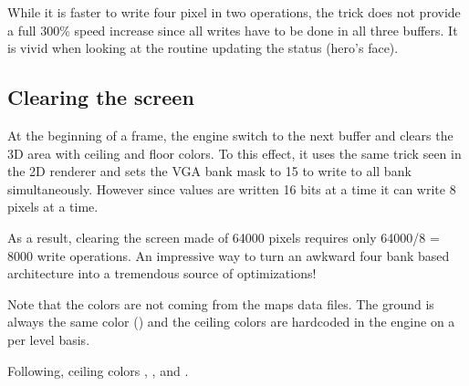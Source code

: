 While it is faster to write four pixel in two operations, the trick does not provide a full 300\% speed increase since all writes have to be done in all three buffers. It is vivid when looking at the routine updating the status (hero's face).\\
\par
\begin{minipage}{\textwidth}

\end{minipage}



\subsection{Clearing the screen}
At the beginning of a frame, the engine switch to the next buffer and clears the 3D area with ceiling and floor colors. To this effect, it uses the same trick seen in the 2D renderer and sets the VGA bank mask to 15 to write to all bank simultaneously. However since values are written 16 bits at a time it can write 8 pixels at a time.\\ 
\par
\begin{minipage}{\textwidth}
 
 \end{minipage}
\par
As a result, clearing the screen made of 64000 pixels requires only 64000/8 = 8000 write operations. An impressive way to turn an awkward four bank based architecture into a tremendous source of optimizations!\\
\par
Note that the colors are not coming from the maps data files. The ground is always the same color () and the ceiling colors are hardcoded in the engine on a per level basis.\\
\par
\begin{minipage}{\textwidth}
 
 \end{minipage}
\par


Following, ceiling colors , ,  and .\\ 
\par
{}






